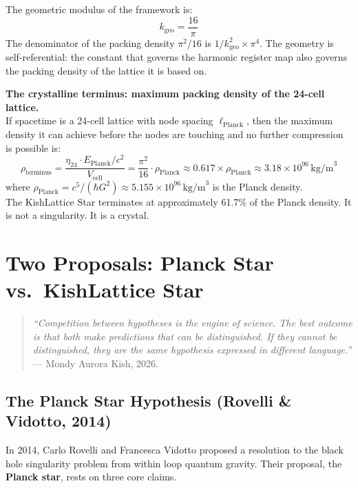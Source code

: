 \documentclass[11pt, letterpaper, openany]{book}
\begin{document}
The geometric modulus of the framework is:
\[
k_\text{geo} = \frac{16}{\pi}
\]
The denominator of the packing density $\pi^2/16$ is $1/k_\text{geo}^2 \times \pi^4$.
The geometry is self-referential: the constant that governs the harmonic
register map also governs the packing density of the lattice it is based on.

\begin{signalbox}
\textbf{The crystalline terminus: maximum packing density of the 24-cell lattice.}\\[0.5em]
If spacetime is a 24-cell lattice with node spacing $\ell_\text{Planck}$,
then the maximum density it can achieve before the nodes are touching and
no further compression is possible is:
\[
\rho_\text{terminus} = \frac{\eta_{24} \cdot E_\text{Planck}/c^2}{V_\text{cell}}
= \frac{\pi^2}{16} \cdot \rho_\text{Planck}
\approx 0.617 \times \rho_\text{Planck}
\approx 3.18 \times 10^{96}\,\text{kg/m}^3
\]
where $\rho_\text{Planck} = c^5/(\hbar G^2) \approx 5.155 \times 10^{96}\,\text{kg/m}^3$
is the Planck density.\\[0.5em]
The KishLattice Star terminates at approximately 61.7\% of the Planck density.
It is not a singularity. It is a crystal.
\end{signalbox}

\clearpage
\chapter{Two Proposals: Planck Star vs.\ KishLattice Star}

\begin{quote}
\textit{``Competition between hypotheses is the engine of science.
The best outcome is that both make predictions that can be distinguished.
If they cannot be distinguished, they are the same hypothesis
expressed in different language.''} --- Mondy Aurora Kish, 2026.
\end{quote}

\section{The Planck Star Hypothesis (Rovelli \& Vidotto, 2014)}

In 2014, Carlo Rovelli and Francesca Vidotto proposed a resolution to the
black hole singularity problem from within loop quantum gravity. Their
proposal, the \textbf{Planck star}, rests on three core claims.
\end{document}
